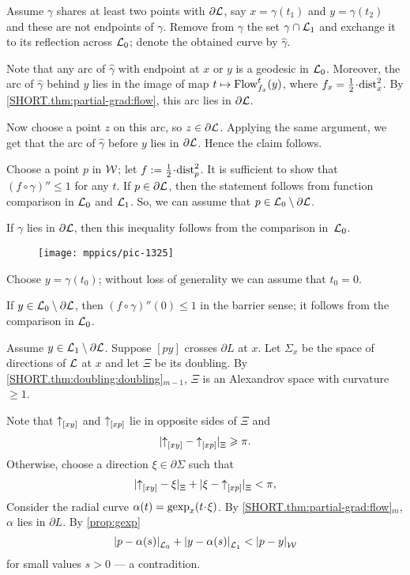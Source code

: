 Assume $\gamma$ shares at least two points with $\partial \mathcal{L}$, say $x=\gamma(t_1)$ and $y=\gamma(t_2)$ and these are not endpoints of $\gamma$.
Remove from $\gamma$ the set $\gamma\cap \mathcal{L}_1$
and exchange it to its reflection across $\mathcal{L}_0$;
denote the obtained curve by $\hat\gamma$.

Note that any arc of $\hat\gamma$ with endpoint at $x$ or $y$ is a geodesic in $\mathcal{L}_0$.
Moreover, the arc of $\hat\gamma$ behind $y$ lies in the image of map $t\mapsto \mathop{\rm Flow}\nolimits^t_{f_x}(y)$, where $f_x=\tfrac12\cdot\distfun^2_x$.
By \ref{SHORT.thm:partial-grad:flow}, this arc lies in $\partial\mathcal{L}$.

Now choose a point $z$ on this arc, so $z\in \partial\mathcal{L}$.
Applying the same argument, we get that the arc of $\hat\gamma$ before $y$ lies in $\partial\mathcal{L}$.
Hence the claim follows.\claimqeds

Choose a point $p$ in $\mathcal{W}$;
let $f\df\tfrac12\cdot\distfun_p^2$.
It is sufficient to show that $(f\circ\gamma)''\le 1$ for any $t$.
If $p\in \partial\mathcal{L}$, then the statement follows from function comparison in $\mathcal{L}_0$ and $\mathcal{L}_1$.
So, we can assume that $p\in \mathcal{L}_0\setminus \partial\mathcal{L}$.

If $\gamma$ lies in $\partial \mathcal{L}$, then this inequality follows from the comparison in~$\mathcal{L}_0$.

\begin{wrapfigure}{r}{45mm}
\vskip-2mm
\centering
\texttt{[image: mppics/pic-1325]}
\end{wrapfigure}

Choose $y=\gamma(t_0)$; without loss of generality we can assume that $t_0=0$.

If $y\z\in \spc{L}_0\setminus\partial\spc{L}$, then $(f\circ\gamma)''(0)\le 1$ in the barrier sense;
it follows from the comparison in $\mathcal{L}_0$.

Assume $y\in \mathcal{L}_1\setminus\partial\mathcal{L}$.
Suppose $[py]$ crosses $\partial L$ at $x$.
Let $\Sigma_x$ be the space of directions of $\mathcal{L}$ at $x$
and let $\Xi$ be its doubling.
By \ref{SHORT.thm:doubling:doubling}$_{m-1}$, $\Xi$ is an Alexandrov space with curvature $\ge1$.

Note that ${\uparrow}_{[{x}{y}]}$ and ${\uparrow}_{[{x}{p}]}$ lie in opposite sides of $\Xi$ and
\[\dist{\dir x{y}}{\dir xp}\Xi\ge \pi.\]
Otherwise, choose a direction $\xi\in\partial\Sigma$ such that
\[\dist{\dir x{y}}{\xi}\Xi+\dist{\xi}{\dir xp}\Xi<\pi,\]
Consider the radial curve $\alpha(t)=\gexp_x(t\cdot \xi)$.
By \ref{SHORT.thm:partial-grad:flow}$_m$, $\alpha$ lies in $\partial L$.
By \ref{prop:gexp}
\[\dist{p}{\alpha(s)}{\spc{L}_0}
+\dist{y}{\alpha(s)}{\spc{L}_1}
<\dist{p}{y}{\spc{W}}\]
for small values $s>0$
--- a contradition.

